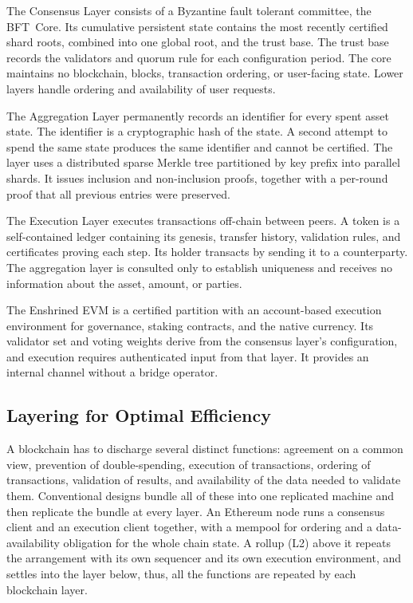 The Consensus Layer consists of a Byzantine fault tolerant committee, the BFT~Core. Its cumulative persistent state contains the most recently certified shard roots, combined into one global root, and the trust base. The trust base records the validators and quorum rule for each configuration period. The core maintains no blockchain, blocks, transaction ordering, or user-facing state. Lower layers handle ordering and availability of user requests.

The Aggregation Layer permanently records an identifier for every spent asset state. The identifier is a cryptographic hash of the state. A second attempt to spend the same state produces the same identifier and cannot be certified. The layer uses a distributed sparse Merkle tree partitioned by key prefix into parallel shards. It issues inclusion and non-inclusion proofs, together with a per-round proof that all previous entries were preserved.

The Execution Layer executes transactions off-chain between peers. A token is a self-contained ledger containing its genesis, transfer history, validation rules, and certificates proving each step. Its holder transacts by sending it to a counterparty. The aggregation layer is consulted only to establish uniqueness and receives no information about the asset, amount, or parties.

The Enshrined EVM is a certified partition with an account-based execution environment for governance, staking contracts, and the native currency. Its validator set and voting weights derive from the consensus layer's configuration, and execution requires authenticated input from that layer. It provides an internal channel without a bridge operator.

\subsection{Layering for Optimal Efficiency}

A blockchain has to discharge several distinct functions: agreement on a common view, prevention of double-spending, execution of transactions, ordering of transactions, validation of results, and availability of the data needed to validate them. Conventional designs bundle all of these into one replicated machine and then replicate the bundle at every layer. An Ethereum node runs a consensus client and an execution client together, with a mempool for ordering and a data-availability obligation for the whole chain state. A rollup (L2) above it repeats the arrangement with its own sequencer and its own execution environment, and settles into the layer below, thus, all the functions are repeated by each blockchain layer.

